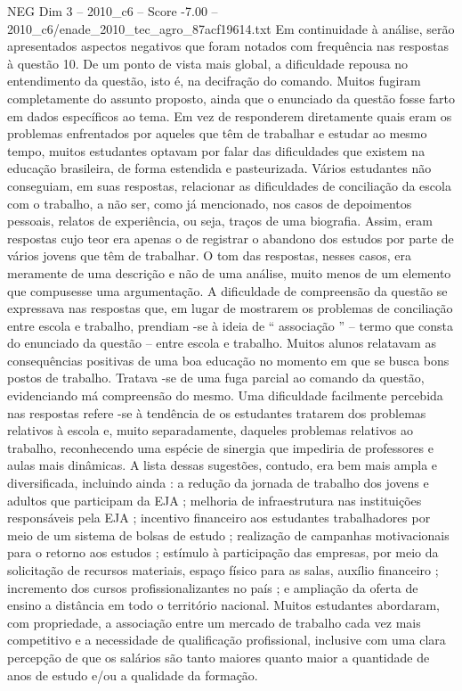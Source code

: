 \begin{textsample}{NEG Dim 3 – 2010\_c6 – Score -7.00 – 2010\_c6/enade\_2010\_tec\_agro\_87acf19614.txt}
Em continuidade à análise, serão apresentados aspectos negativos que foram notados com frequência nas respostas à questão 10.
De um ponto de vista mais global, a dificuldade repousa no entendimento da questão, isto é, na decifração do comando.
Muitos fugiram completamente do assunto proposto, ainda que o enunciado da questão fosse farto em dados específicos ao tema.
Em vez de responderem diretamente quais eram os problemas enfrentados por aqueles que têm de trabalhar e estudar ao mesmo tempo, muitos estudantes optavam por falar das dificuldades que existem na educação brasileira, de forma estendida e pasteurizada.
Vários estudantes não conseguiam, em suas respostas, relacionar as dificuldades de conciliação da escola com o trabalho, a não ser, como já mencionado, nos casos de depoimentos pessoais, relatos de experiência, ou seja, traços de uma biografia.
Assim, eram respostas cujo teor era apenas o de registrar o abandono dos estudos por parte de vários jovens que têm de trabalhar.
O tom das respostas, nesses casos, era meramente de uma descrição e não de uma análise, muito menos de um elemento que compusesse uma argumentação.
A dificuldade de compreensão da questão se expressava nas respostas que, em lugar de mostrarem os problemas de conciliação entre escola e trabalho, prendiam -se à ideia de “ associação ” – termo que consta do enunciado da questão – entre escola e trabalho.
Muitos alunos relatavam as consequências positivas de uma boa educação no momento em que se busca bons postos de trabalho.
Tratava -se de uma fuga parcial ao comando da questão, evidenciando má compreensão do mesmo.
Uma dificuldade facilmente percebida nas respostas refere -se à tendência de os estudantes tratarem dos problemas relativos à escola e, muito separadamente, daqueles problemas relativos ao trabalho, reconhecendo uma espécie de sinergia que impediria de professores e aulas mais dinâmicas.
A lista dessas sugestões, contudo, era bem mais ampla e diversificada, incluindo ainda : a redução da jornada de trabalho dos jovens e adultos que participam da EJA ; melhoria de infraestrutura nas instituições responsáveis pela EJA ; incentivo financeiro aos estudantes trabalhadores por meio de um sistema de bolsas de estudo ; realização de campanhas motivacionais para o retorno aos estudos ; estímulo à participação das empresas, por meio da solicitação de recursos materiais, espaço físico para as salas, auxílio financeiro ; incremento dos cursos profissionalizantes no país ; e ampliação da oferta de ensino a distância em todo o território nacional.
Muitos estudantes abordaram, com propriedade, a associação entre um mercado de trabalho cada vez mais competitivo e a necessidade de qualificação profissional, inclusive com uma clara percepção de que os salários são tanto maiores quanto maior a quantidade de anos de estudo e/ou a qualidade da formação.

\end{textsample}
